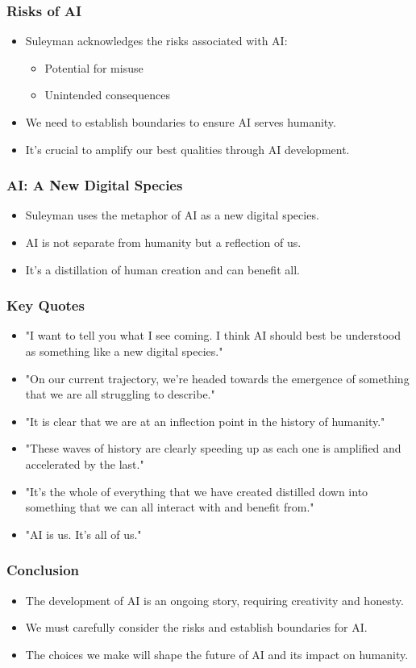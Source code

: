 \documentclass{beamer} \usepackage{graphicx}
\begin{document}
\begin{frame} \frametitle{Risks of AI} \begin{itemize} \item Suleyman acknowledges the risks associated with AI: \begin{itemize} \item Potential for misuse \item Unintended consequences \end{itemize} \item We need to establish boundaries to ensure AI serves humanity. \item It's crucial to amplify our best qualities through AI development. \end{itemize} \end{frame}

\begin{frame} \frametitle{AI: A New Digital Species} \begin{itemize} \item Suleyman uses the metaphor of AI as a new digital species. \item AI is not separate from humanity but a reflection of us. \item It's a distillation of human creation and can benefit all. \end{itemize} \end{frame}

\begin{frame} \frametitle{Key Quotes} \begin{itemize} \item "I want to tell you what I see coming. I think AI should best be understood as something like a new digital species." \item "On our current trajectory, we're headed towards the emergence of something that we are all struggling to describe." \item "It is clear that we are at an inflection point in the history of humanity." \item "These waves of history are clearly speeding up as each one is amplified and accelerated by the last." \item "It's the whole of everything that we have created distilled down into something that we can all interact with and benefit from." \item "AI is us. It's all of us." \end{itemize} \end{frame}

\begin{frame} \frametitle{Conclusion} \begin{itemize} \item The development of AI is an ongoing story, requiring creativity and honesty. \item We must carefully consider the risks and establish boundaries for AI. \item The choices we make will shape the future of AI and its impact on humanity. \end{itemize} \end{frame}
\end{document}
